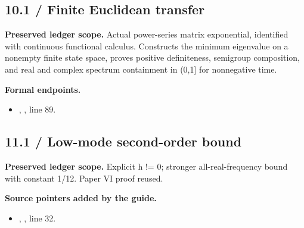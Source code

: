 \subsection{10.1 / Finite Euclidean transfer}
\label{result:10.1}
\textbf{Preserved ledger scope.} Actual power-series matrix exponential, identified with continuous functional calculus. Constructs the minimum eigenvalue on a nonempty finite state space, proves positive definiteness, semigroup composition, and real and complex spectrum containment in (0,1] for nonnegative time.

\textbf{Formal endpoints.}\begin{itemize}
\item {}, , line 89.
\end{itemize}
\subsection{11.1 / Low-mode second-order bound}
\label{result:11.1}
\textbf{Preserved ledger scope.} Explicit h != 0; stronger all-real-frequency bound with constant 1/12. Paper VI proof reused.

\textbf{Source pointers added by the guide.}\begin{itemize}
\item {}, , line 32.
\end{itemize}
